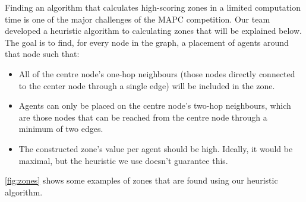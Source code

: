 Finding an algorithm that calculates high-scoring zones in a limited computation time is one of the major challenges of the MAPC competition.
Our team developed a heuristic algorithm to calculating zones that will be explained below.
The goal is to find, for every node in the graph, a placement of agents around that node such that:
\begin{itemize}
  \item All of the centre node's one-hop neighbours (those nodes directly connected to the center node through a single edge) will be included in the zone.
  \item Agents can only be placed on the centre node's two-hop neighbours, which are those nodes that can be reached from the centre node through a minimum of two edges.
  \item The constructed zone's value per agent should be high.
        Ideally, it would be maximal, but the heuristic we use doesn't guarantee this.
\end{itemize}
\autoref{fig:zones} shows some examples of zones that are found using our heuristic algorithm.
